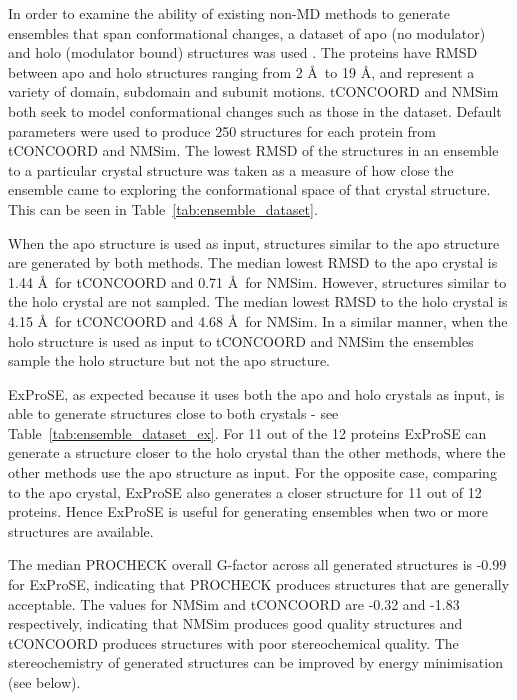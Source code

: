 In order to examine the ability of existing non-MD methods to generate ensembles that span conformational changes, a dataset of apo (no modulator) and holo (modulator bound) structures was used \cite{Atilgan2010}.
The proteins have RMSD between apo and holo structures ranging from 2 \AA\ to 19 \AA, and represent a variety of domain, subdomain and subunit motions.
tCONCOORD \cite{Seeliger2007} and NMSim \cite{Kruger2012} both seek to model conformational changes such as those in the dataset.
Default parameters were used to produce 250 structures for each protein from tCONCOORD and NMSim.
The lowest RMSD of the structures in an ensemble to a particular crystal structure was taken as a measure of how close the ensemble came to exploring the conformational space of that crystal structure.
This can be seen in Table~\ref{tab:ensemble_dataset}.

When the apo structure is used as input, structures similar to the apo structure are generated by both methods.
The median lowest RMSD to the apo crystal is 1.44 \AA\ for tCONCOORD and 0.71 \AA\ for NMSim.
However, structures similar to the holo crystal are not sampled.
The median lowest RMSD to the holo crystal is 4.15 \AA\ for tCONCOORD and 4.68 \AA\ for NMSim.
In a similar manner, when the holo structure is used as input to tCONCOORD and NMSim the ensembles sample the holo structure but not the apo structure.

ExProSE, as expected because it uses both the apo and holo crystals as input, is able to generate structures close to both crystals - see Table~\ref{tab:ensemble_dataset_ex}.
For 11 out of the 12 proteins ExProSE can generate a structure closer to the holo crystal than the other methods, where the other methods use the apo structure as input.
For the opposite case, comparing to the apo crystal, ExProSE also generates a closer structure for 11 out of 12 proteins.
Hence ExProSE is useful for generating ensembles when two or more structures are available.

The median PROCHECK overall G-factor across all generated structures is -0.99 for ExProSE, indicating that PROCHECK produces structures that are generally acceptable.
The values for NMSim and tCONCOORD are -0.32 and -1.83 respectively, indicating that NMSim produces good quality structures and tCONCOORD produces structures with poor stereochemical quality.
The stereochemistry of generated structures can be improved by energy minimisation (see below).


